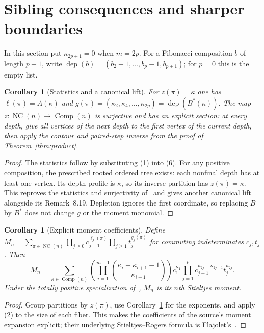 \documentclass[11pt]{article}
\newtheorem{corollary}[theorem]{Corollary}
\newcommand{\NC}{\operatorname{NC}}
\newcommand{\Comp}{\operatorname{Comp}}
\begin{document}
\section{Sibling consequences and sharper boundaries}
In this section put $\kappa_{2p+1}=0$ when $m=2p$.
For a Fibonacci composition $b$ of length $p+1$, write
$\operatorname{dep}(b)=(b_2-1,\ldots,b_p-1,b_{p+1})$;
for $p=0$ this is the empty list.

\begin{corollary}[Statistics and a canonical lift]\label{cor:lift}
For $z(\pi)=\kappa$ one has
$\ell(\pi)=A(\kappa)$ and
$g(\pi)=(\kappa_2,\kappa_4,\ldots,\kappa_{2p})
=\operatorname{dep}(B^*(\kappa))$.
The map $z:\NC(n)\to\Comp(n)$ is surjective and has an explicit
section: at every depth, give all vertices of the next depth to the
first vertex of the current depth, then apply the contour and paired-step
inverse from the proof of Theorem~\ref{thm:product}.
\end{corollary}
\begin{proof}
The statistics follow by substituting (1) into (6).
For any positive composition, the prescribed rooted ordered tree exists:
each nonfinal depth has at least one vertex. Its depth profile is
$\kappa$, so its inverse partition has $z(\pi)=\kappa$.
This reproves the statistics and surjectivity of~\cite[Lemma~8.17,
Proposition~8.18]{PS} and gives another canonical lift alongside its
Remark~8.19. Depletion ignores the first coordinate, so replacing $B$
by $B^*$ does not change $g$ or the moment monomial.
\end{proof}

\begin{corollary}[Explicit moment coefficients]\label{cor:moments}
Define $M_n=\sum_{\pi\in\NC(n)}
\prod_{j\ge0}c_{j+1}^{\ell_j(\pi)}
\prod_{j\ge1}t_j^{g_j(\pi)}$ for commuting indeterminates $c_j,t_j$.
Then
\[
 M_n=\sum_{\kappa\in\Comp(n)}
 \left(\prod_{i=1}^{m-1}
 \binom{\kappa_i+\kappa_{i+1}-1}{\kappa_{i+1}}\right)
 c_1^{\kappa_1}\prod_{j=1}^{p}
 c_{j+1}^{\kappa_{2j}+\kappa_{2j+1}}t_j^{\kappa_{2j}}.
 \tag{12}
\]
Under the totally positive specialization of~\cite[Proposition~8.8,
Corollary~8.20]{PS}, $M_n$ is its $n$th Stieltjes moment.
\end{corollary}
\begin{proof}
Group partitions by $z(\pi)$, use Corollary~\ref{cor:lift} for the
exponents, and apply (2) to the size of each fiber. This makes the
coefficients of the source's moment expansion explicit; their underlying
Stieltjes--Rogers formula is Flajolet's~\cite[Proposition~3B]{F}.
\end{proof}
\end{document}
